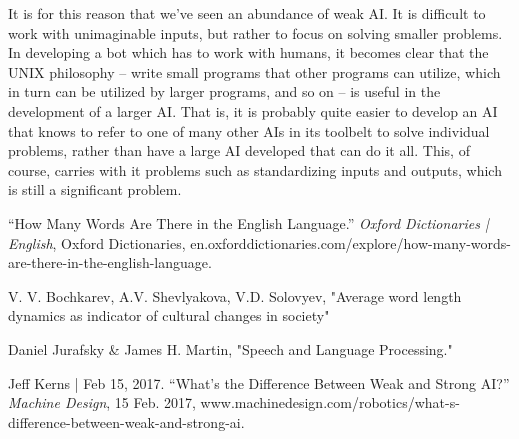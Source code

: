 \documentclass{article}
\begin{document}
        It is for this reason that we've seen an abundance of weak AI\cite{weakAI}. It is difficult to work with unimaginable inputs, but rather to focus on solving smaller problems. In developing a bot which has to work with humans, it becomes clear that the UNIX philosophy -- write small programs that other programs can utilize, which in turn can be utilized by larger programs, and so on -- is useful in the development of a larger AI. That is, it is probably quite easier to develop an AI that knows to refer to one of many other AIs in its toolbelt to solve individual problems, rather than have a large AI developed that can do it all. This, of course, carries with it problems such as standardizing inputs and outputs, which is still a significant problem.


\newpage

\begin{thebibliography}{6}

“How Many Words Are There in the English Language.” \textit{Oxford Dictionaries | English}, Oxford Dictionaries, en.oxforddictionaries.com/explore/how-many-words-are-there-in-the-english-language. 

V. V.  Bochkarev, A.V. Shevlyakova, V.D. Solovyev, "Average word length dynamics as indicator of cultural changes in society"

Daniel Jurafsky & James H. Martin, "Speech and Language Processing."

Jeff Kerns | Feb 15, 2017. “What's the Difference Between Weak and Strong AI?” \textit{Machine Design}, 15 Feb. 2017, www.machinedesign.com/robotics/what-s-difference-between-weak-and-strong-ai. 

\end{thebibliography}
\end{document}
